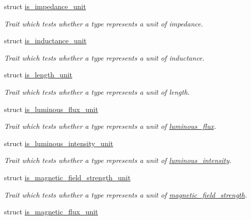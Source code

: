 \begin{DoxyCompactItemize}
struct \hyperlink{structunits_1_1traits_1_1is__impedance__unit}{is\+\_\+impedance\+\_\+unit}
\begin{DoxyCompactList}\small\item\em Trait which tests whether a type represents a unit of impedance. \end{DoxyCompactList}\item 
struct \hyperlink{structunits_1_1traits_1_1is__inductance__unit}{is\+\_\+inductance\+\_\+unit}
\begin{DoxyCompactList}\small\item\em Trait which tests whether a type represents a unit of inductance. \end{DoxyCompactList}\item 
struct \hyperlink{structunits_1_1traits_1_1is__length__unit}{is\+\_\+length\+\_\+unit}
\begin{DoxyCompactList}\small\item\em Trait which tests whether a type represents a unit of length. \end{DoxyCompactList}\item 
struct \hyperlink{structunits_1_1traits_1_1is__luminous__flux__unit}{is\+\_\+luminous\+\_\+flux\+\_\+unit}
\begin{DoxyCompactList}\small\item\em Trait which tests whether a type represents a unit of \hyperlink{namespaceunits_1_1luminous__flux}{luminous\+\_\+flux}. \end{DoxyCompactList}\item 
struct \hyperlink{structunits_1_1traits_1_1is__luminous__intensity__unit}{is\+\_\+luminous\+\_\+intensity\+\_\+unit}
\begin{DoxyCompactList}\small\item\em Trait which tests whether a type represents a unit of \hyperlink{namespaceunits_1_1luminous__intensity}{luminous\+\_\+intensity}. \end{DoxyCompactList}\item 
struct \hyperlink{structunits_1_1traits_1_1is__magnetic__field__strength__unit}{is\+\_\+magnetic\+\_\+field\+\_\+strength\+\_\+unit}
\begin{DoxyCompactList}\small\item\em Trait which tests whether a type represents a unit of \hyperlink{namespaceunits_1_1magnetic__field__strength}{magnetic\+\_\+field\+\_\+strength}. \end{DoxyCompactList}\item 
struct \hyperlink{structunits_1_1traits_1_1is__magnetic__flux__unit}{is\+\_\+magnetic\+\_\+flux\+\_\+unit}

\end{DoxyCompactItemize}
